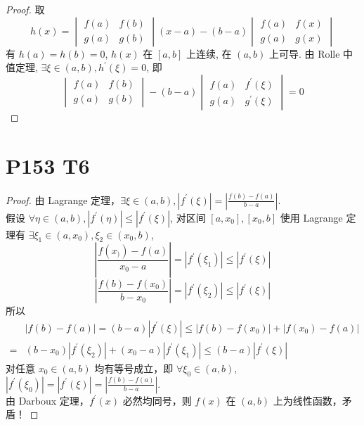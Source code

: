 \documentclass{article}
\begin{document}
\begin{proof}
    取 
    \[
        h(x) = 
        \begin{vmatrix}
            f(a) & f(b) \\
            g(a) & g(b)
        \end{vmatrix}(x - a) - (b - a)
        \begin{vmatrix}
            f(a) & f(x) \\
            g(a) & g(x) 
        \end{vmatrix}
    \]
    有 $h(a) = h(b) = 0$, $h(x)$ 在 $[a, b]$ 上连续, 在 $(a, b)$ 上可导.  由 Rolle 中值定理, $\exists \xi \in (a, b), h^\prime(\xi) = 0$, 即 
    \[
        \begin{vmatrix}
            f(a) & f(b) \\
            g(a) & g(b)
        \end{vmatrix} - (b - a)
        \begin{vmatrix}
            f(a) & f^\prime(\xi) \\
            g(a) & g^\prime(\xi) 
        \end{vmatrix} = 0
    \]
\end{proof}

\section*{P153 T6}

\begin{proof}
    由 Lagrange 定理，$\exists \xi \in (a, b), \left\lvert f^\prime(\xi)\right\rvert  = \left\lvert \displaystyle{\frac{f(b) - f(a)}{b - a}}\right\rvert $. \\
    假设 $\forall \eta \in (a, b), \left\lvert f^\prime(\eta)\right\rvert \leqslant \left\lvert f^\prime(\xi)\right\rvert  $, 对区间 $[a, x_0], [x_0, b]$ 使用 Lagrange 定理有 $\exists \xi_1 \in (a, x_0), \xi_2 \in (x_0, b)$, 
    \[
        \left\lvert \frac{f(x_)) - f(a)}{x_0 - a}\right\rvert = \left\lvert f^\prime(\xi_1)\right\rvert \leqslant \left\lvert f^\prime(\xi)\right\rvert 
    \]
    \[
        \left\lvert \frac{f(b) - f(x_0)}{b - x_0}\right\rvert = \left\lvert f^\prime(\xi_2)\right\rvert \leqslant \left\lvert f^\prime(\xi)\right\rvert 
    \]
    所以
    \begin{align*}
        &\left\lvert f(b) - f(a)\right\rvert = (b - a)\left\lvert f^\prime(\xi)\right\rvert \leqslant \left\lvert f(b) - f(x_0)\right\rvert + \left\lvert f(x_0) - f(a)\right\rvert \\
        =& (b - x_0)\left\lvert f^\prime(\xi_2)\right\rvert + (x_0 - a)\left\lvert f^\prime(\xi_1)\right\rvert \leqslant (b - a)\left\lvert f^\prime(\xi)\right\rvert         
    \end{align*}
    对任意 $x_0 \in (a, b)$ 均有等号成立，即 $\forall \xi_0 \in (a, b)$, $\left\lvert f^\prime(\xi_0)\right\rvert = \left\lvert f^\prime(\xi)\right\rvert = \left\lvert \displaystyle{\frac{f(b) - f(a)}{b - a}}\right\rvert$. \\
    由 Darboux 定理，$f^\prime(x)$ 必然均同号，则 $f(x)$ 在 $(a, b)$ 上为线性函数，矛盾！
\end{proof}
\end{document}
